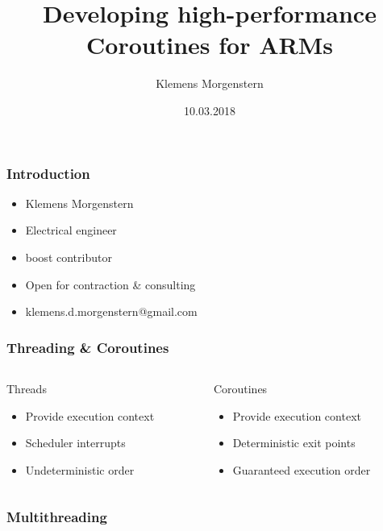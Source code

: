 \documentclass{beamer}
\begin{document}


\title{Developing high-performance Coroutines for ARMs}
\author{Klemens Morgenstern}
\date{10.03.2018}

\frame{\titlepage}



\begin{frame}
\frametitle{Introduction}
\begin{itemize}
\item Klemens Morgenstern
\item Electrical engineer
\item boost contributor
\item Open for contraction \& consulting
\item klemens.d.morgenstern@gmail.com
\end{itemize}
\end{frame}

\begin{frame}
\frametitle{Threading \& Coroutines}


\begin{columns}
\begin{column}{0.5\textwidth}
Threads
\begin{itemize}
\item<1-> Provide execution context
\item<2-> Scheduler interrupts 
\item<3-> Undeterministic order
\end{itemize}
\end{column}
\begin{column}{0.5\textwidth}
Coroutines
\begin{itemize}
\item<1-> Provide execution context
\item<2-> Deterministic exit points
\item<3-> Guaranteed execution order
\end{itemize}
\end{column}
\end{columns}

\end{frame}
\begin{frame}
\frametitle{Multithreading}
\begin{adjustbox}{max totalsize={.9\textwidth}{.7\textheight},center}

\end{adjustbox}
\end{frame}
\end{document}
